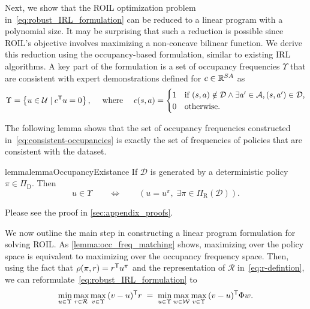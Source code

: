 \documentclass[10pt]{article}
\theoremstyle{plain}
\theoremstyle{remark}
\begin{document}
Next, we show that the ROIL optimization problem in~\eqref{eq:robust_IRL_formulation} can be reduced to a linear program with a polynomial size. It may be surprising that such a reduction is possible since ROIL's objective involves maximizing a non-concave bilinear function. We derive this reduction using the occupancy-based formulation, similar to existing IRL algorithms. A key part of the formulation is a set of occupancy frequencies $\Upsilon$ that are consistent with expert demonstrations defined for $c\in \mathbb{R}^{SA}$ as 
%
\begin{equation}\label{eq:consistent-occupancies}
  \Upsilon = \left\{ u \in \mathcal{U} \mid c^{\mathsf{T}} u = 0  \right\},
  \quad
  \text{ where }
  \quad
  c(s,a) =
  \begin{cases}
    1 &\text{if  }
        (s,a) \notin \mathcal{D} \wedge
        \exists a'\in \mathcal{A}, (s, a') \in \mathcal{D}, \\
    0 & \text{otherwise}.
  \end{cases}
\end{equation}




The following lemma shows that the set of occupancy frequencies constructed in~\eqref{eq:consistent-occupancies} is exactly the set of frequencies of policies that are consistent with the dataset. 
\begin{restatable}{lemma}{lemmaOccupancyExistance}
\label{lemma:occ_freq_matching}
If $\mathcal{D}$ is generated by a deterministic policy $\pi \in \Pi_{\mathrm{D}}$. Then
\[
  u \in \Upsilon
  \qquad \Leftrightarrow \qquad
  \left(u = u^{\pi},\;  \exists \pi \in \Pi_{\mathrm{R}}(\mathcal{D})\right).
\]
\end{restatable}
Please see the proof in \cref{sec:appendix_proofs}.

We now outline the main step in constructing a linear program formulation for solving ROIL. As \cref{lemma:occ_freq_matching} shows,  maximizing over the policy space is equivalent to maximizing over the occupancy frequency space. Then, using the fact that $\rho(\pi,r) = r^{\mathsf{T}} u^{\pi}$ and the representation of $\mathcal{R}$ in~\eqref{eq:r-defintion}, we can reformulate~\eqref{eq:robust_IRL_formulation} to
%
\begin{equation} \label{eq:roil-occupancy}
    \min_{u \in \Upsilon} \max_{r \in \mathcal{R}} \max_{v \in \Upsilon} \, (v- u )^{\mathsf{T}}  r
    \; =\; 
    \min_{u \in \Upsilon} \max_{w \in \mathcal{W}} \max_{v \in \Upsilon} \, (v - u)^{\mathsf{T}} \Phi w.
\end{equation}
%
\end{document}
